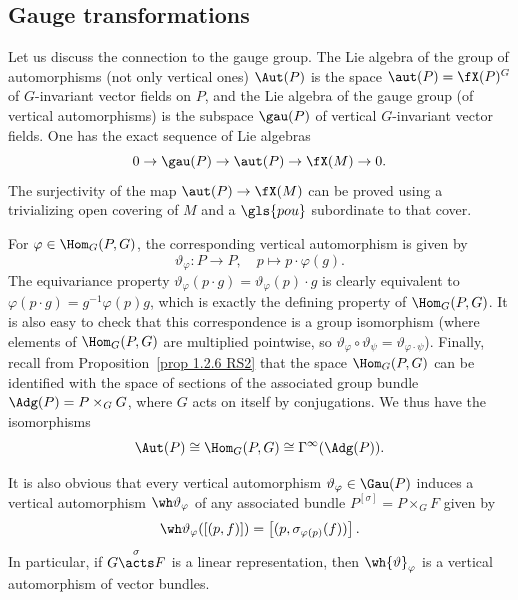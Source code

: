 







\subsection{Gauge transformations}


Let us discuss the connection to the gauge group. The Lie algebra of the group of automorphisms (not only vertical ones) $\Aut(P)$ is the space $\aut(P)=\fX(P)^G$ of $G$-invariant vector fields on $P$, and the Lie algebra of the gauge group (of vertical automorphisms) is the subspace $\gau(P)$ of vertical $G$-invariant vector fields. One has the exact sequence of Lie algebras
\[0\to \gau(P)\to \aut(P)\to \fX(M)\to 0.\]
The surjectivity of the map $\aut(P)\to \fX(M)$ can be proved using a trivializing open covering of $M$ and a $\gls{pou}$ subordinate to that cover. 


For $\varphi\in \Hom_G(P,G)$, the corresponding vertical automorphism is given by
\[\vartheta_\varphi:P\to P,\quad p\mapsto p\cdot \varphi(g).\label{eq 1.8.2 RS2}\]
The equivariance property $\vartheta_\varphi(p\cdot g)=\vartheta_\varphi(p)\cdot g$ is clearly equivalent to $\varphi(p\cdot g)=g^{-1}\varphi(p)g$, which is exactly the defining property of $\Hom_G(P,G)$. It is also easy to check that this correspondence is a group isomorphism (where elements of $\Hom_G(P,G)$ are multiplied pointwise, so $\vartheta_\varphi\circ\vartheta_\psi=\vartheta_{\varphi\cdot\psi}$). Finally, recall from Proposition~\ref{prop 1.2.6 RS2} that the space $\Hom_G(P,G)$ can be identified with the space of sections of the associated group bundle $\Adg(P)=P\times_G G$, where $G$ acts on itself by conjugations. We thus have the isomorphisms
\[\Aut(P)\cong \Hom_G(P,G)\cong \Gamma^\infty(\Adg(P)).\]

It is also obvious that every vertical automorphism $\vartheta_\varphi\in\Gau(P)$ induces a vertical automorphism $\wh\vartheta_\varphi$ of any associated bundle $P^{[\sigma]}=P\times_G F$ given by
\[\wh\vartheta_\varphi([(p,f)])=\left[(p,\sigma_{\varphi(p)}(f))\right].\]
In particular, if $G\overset{\sigma}{\acts}F$ is a linear representation, then $\wh{\vartheta}_\varphi$ is a vertical automorphism of vector bundles.


